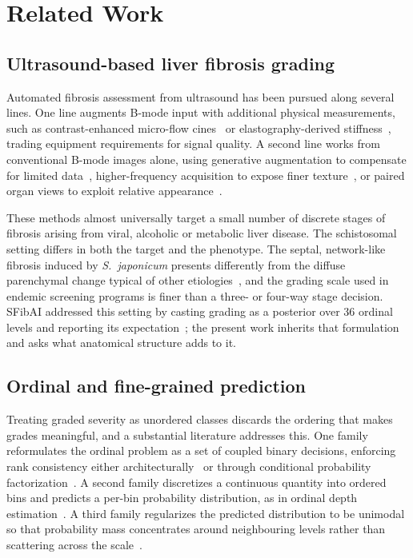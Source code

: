 \section{Related Work}
\label{sec:related}

\subsection{Ultrasound-based liver fibrosis grading}

Automated fibrosis assessment from ultrasound has been pursued along several
lines. One line augments B-mode input with additional physical measurements,
such as contrast-enhanced micro-flow cines~\cite{microflow2023} or
elastography-derived stiffness~\cite{swe2018staging}, trading equipment
requirements for signal quality. A second line works from conventional B-mode
images alone, using generative augmentation to compensate for limited
data~\cite{usfibrosisgan2022}, higher-frequency acquisition to expose
finer texture~\cite{hfus2025}, or paired organ views to exploit relative
appearance~\cite{liverspleen2025}.

These methods almost universally target a small number of discrete stages of
fibrosis arising from viral, alcoholic or metabolic liver disease. The
schistosomal setting differs in both the target and the phenotype. The septal,
network-like fibrosis induced by \emph{S.~japonicum} presents differently from
the diffuse parenchymal change typical of other
etiologies~\cite{schistoelasto2018,schistopocus2024}, and the grading scale used
in endemic screening programs is finer than a three- or four-way stage decision.
SFibAI addressed this setting by casting grading as a posterior over 36 ordinal
levels and reporting its expectation~\cite{xu2026sfibai}; the present work
inherits that formulation and asks what anatomical structure adds to it.

\subsection{Ordinal and fine-grained prediction}

Treating graded severity as unordered classes discards the ordering that makes
grades meaningful, and a substantial literature addresses this. One family
reformulates the ordinal problem as a set of coupled binary decisions, enforcing
rank consistency either architecturally~\cite{coral2020} or through conditional
probability factorization~\cite{corn2023}. A second family discretizes a
continuous quantity into ordered bins and predicts a per-bin probability
distribution, as in ordinal depth
estimation~\cite{dorn2018}. A third family regularizes the predicted
distribution to be unimodal so that probability mass concentrates around
neighbouring levels rather than scattering across the
scale~\cite{unimodalbeta2021}.

